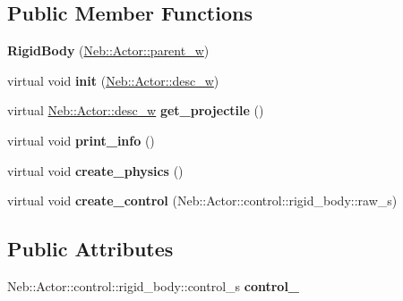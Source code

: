 \subsection*{\-Public \-Member \-Functions}
\begin{DoxyCompactItemize}
\item 
\hypertarget{classNeb_1_1Actor_1_1RigidBody_1_1RigidBody_aab1f884b2c66e52633c75efdb640c288}{{\bfseries \-Rigid\-Body} (\hyperlink{classNeb_1_1weak__ptr}{\-Neb\-::\-Actor\-::parent\-\_\-w})}\label{classNeb_1_1Actor_1_1RigidBody_1_1RigidBody_aab1f884b2c66e52633c75efdb640c288}

\item 
\hypertarget{classNeb_1_1Actor_1_1RigidBody_1_1RigidBody_a527f51d5b116f572301368820090874d}{virtual void {\bfseries init} (\hyperlink{classNeb_1_1weak__ptr}{\-Neb\-::\-Actor\-::desc\-\_\-w})}\label{classNeb_1_1Actor_1_1RigidBody_1_1RigidBody_a527f51d5b116f572301368820090874d}

\item 
\hypertarget{classNeb_1_1Actor_1_1RigidBody_1_1RigidBody_ae26f0470862dd64c9ab6ef485986ed9d}{virtual \hyperlink{classNeb_1_1weak__ptr}{\-Neb\-::\-Actor\-::desc\-\_\-w} {\bfseries get\-\_\-projectile} ()}\label{classNeb_1_1Actor_1_1RigidBody_1_1RigidBody_ae26f0470862dd64c9ab6ef485986ed9d}

\item 
\hypertarget{classNeb_1_1Actor_1_1RigidBody_1_1RigidBody_aaf8911b9065f428403bbb949c29766d0}{virtual void {\bfseries print\-\_\-info} ()}\label{classNeb_1_1Actor_1_1RigidBody_1_1RigidBody_aaf8911b9065f428403bbb949c29766d0}

\item 
\hypertarget{classNeb_1_1Actor_1_1RigidBody_1_1RigidBody_ada77ea4dabbcc6e4c68949d8d0065ff4}{virtual void {\bfseries create\-\_\-physics} ()}\label{classNeb_1_1Actor_1_1RigidBody_1_1RigidBody_ada77ea4dabbcc6e4c68949d8d0065ff4}

\item 
\hypertarget{classNeb_1_1Actor_1_1RigidBody_1_1RigidBody_a4ebcb321b453db83bfa9de435fad5987}{virtual void {\bfseries create\-\_\-control} (\-Neb\-::\-Actor\-::control\-::rigid\-\_\-body\-::raw\-\_\-s)}\label{classNeb_1_1Actor_1_1RigidBody_1_1RigidBody_a4ebcb321b453db83bfa9de435fad5987}

\end{DoxyCompactItemize}
\subsection*{\-Public \-Attributes}
\begin{DoxyCompactItemize}
\item 
\hypertarget{classNeb_1_1Actor_1_1RigidBody_1_1RigidBody_a7beccd1888a6ef97282167264aa2e5b8}{\-Neb\-::\-Actor\-::control\-::rigid\-\_\-body\-::control\-\_\-s {\bfseries control\-\_\-}}\label{classNeb_1_1Actor_1_1RigidBody_1_1RigidBody_a7beccd1888a6ef97282167264aa2e5b8}

\end{DoxyCompactItemize}
